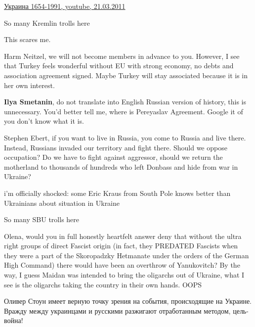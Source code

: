 \begin{itemize}
\begin{itemize}
\href{https://www.youtube.com/watch?v=3b_OzQUbZ_w}{%
Украина 1654-1991, youtube, 21.03.2011%
}

So many Kremlin trolls here

This scares me.


Harm Neitzel, we will not become members in advance to you. However, I see that
Turkey feels wonderful without EU with strong economy, no debts and association
agreement signed. Maybe Turkey will stay associated because it is in her own
interest.

\textbf{Ilya Smetanin}, do not translate into English Russian version of
history, this is unnecessary. You'd better tell me, where is Pereyaslav
Agreement. Google it of you don't know what it is.


Stephen Ebert, if you want to live in Russia, you come to Russia and live
there. Instead, Russians invaded our territory and fight there. Should we
oppose occupation? Do we have to fight against aggressor, should we return the
motherland to thousands of hundreds who left Donbass and hide from war in
Ukraine?


i'm officially shocked: some Eric Kraus from South Pole knows better than Ukrainians about situation in Ukraine

So many SBU trolls here


Olena, would you in full honestly heartfelt answer deny that without the ultra
right groups of direct Fascist origin (in fact, they PREDATED Fascists when
they were a part of the Skoropadzky Hetmanate under the orders of the German
High Command) there would have been an overthrow of Yanukovitch? By the way, I
guess Maidan was intended to bring the oligarchs out of Ukraine, what I see is
the oligarchs taking the country in their own hands. OOPS


Оливер Стоун имеет верную точку зрения на события, происходящие на Украине.
Вражду между украинцами и русскими разжигают отработанным методом, цель-война!

\end{itemize} %



\end{itemize}
